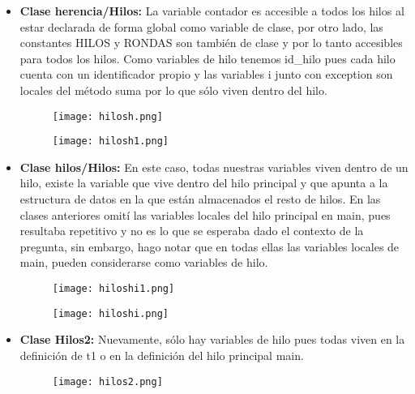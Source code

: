 \documentclass{article}
\begin{document}
\begin{enumerate}
\begin{itemize}
\begin{figure}[!h]
        \end{figure}
        \item \textbf{Clase herencia/Hilos:} La variable contador es accesible a todos los hilos al estar declarada de forma global como variable de clase, por otro lado, las constantes HILOS y RONDAS son también de clase y por lo tanto accesibles para todos los hilos. Como variables de hilo tenemos id\_hilo pues cada hilo cuenta con un identificador propio y las variables i junto con exception son locales del método suma por lo que sólo viven dentro del hilo.
        \begin{figure}[!h]
            \centering
            \texttt{[image: hilosh.png]}        
        \end{figure}
        \begin{figure}[!h]
            \centering
            \texttt{[image: hilosh1.png]}        
        \end{figure}
        \newpage
        \item \textbf{Clase hilos/Hilos:} En este caso, todas nuestras variables viven dentro de un hilo, existe la variable  que vive dentro del hilo principal y que apunta a la estructura de datos en la que están almacenados el resto de hilos. En las clases anteriores omití las variables locales del hilo principal en main, pues resultaba repetitivo y no es lo que se esperaba dado el contexto de la pregunta, sin embargo, hago notar que en todas ellas las variables locales de main, pueden considerarse como variables de hilo.
        \begin{figure}[!h]
            \centering
            \texttt{[image: hiloshi1.png]}        
        \end{figure}
        \begin{figure}[!h]
            \centering
            \texttt{[image: hiloshi.png]}        
        \end{figure}
        \newpage
        \item \textbf{Clase Hilos2:} Nuevamente, sólo hay variables de hilo pues todas viven en la definición de t1 o en la definición del hilo principal main.
        \begin{figure}[!h]
            \centering
            \texttt{[image: hilos2.png]}        
        \end{figure}
    \end{itemize}
    
    
    

\end{enumerate}
\end{document}
